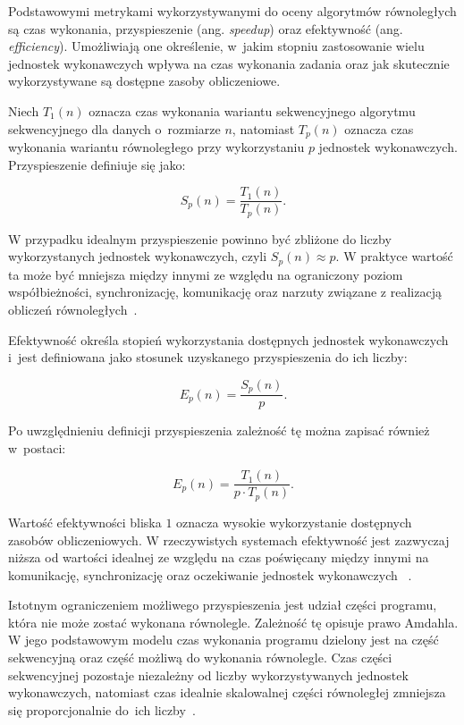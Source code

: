 Podstawowymi metrykami wykorzystywanymi do oceny algorytmów równoległych są czas wykonania,
przyspieszenie (ang. \textit{speedup}) oraz efektywność (ang. \textit{efficiency}).
Umożliwiają one określenie, w~jakim stopniu zastosowanie wielu jednostek wykonawczych wpływa na czas wykonania
zadania oraz jak skutecznie wykorzystywane są dostępne zasoby obliczeniowe.

Niech $T_1(n)$ oznacza czas wykonania wariantu sekwencyjnego algorytmu sekwencyjnego dla danych o~rozmiarze $n$, 
natomiast $T_p(n)$ oznacza czas wykonania wariantu równoległego przy wykorzystaniu $p$ jednostek wykonawczych. 
Przyspieszenie definiuje się jako:

\begin{equation}
    S_p(n) = \frac{T_1(n)}{T_p(n)}.
\end{equation}

W przypadku idealnym przyspieszenie powinno być zbliżone do liczby
wykorzystanych jednostek wykonawczych, czyli $S_p(n) \approx p$. W praktyce wartość ta może być mniejsza między innymi 
ze względu na ograniczony poziom współbieżności, synchronizację, komunikację oraz narzuty związane 
z realizacją obliczeń równoległych~\cite{bib:Jaja,bib:Grama}.

Efektywność określa stopień wykorzystania dostępnych jednostek wykonawczych i~jest definiowana
jako stosunek uzyskanego przyspieszenia do ich liczby:

\begin{equation}
    E_p(n) = \frac{S_p(n)}{p}.
\end{equation}

Po uwzględnieniu definicji przyspieszenia zależność tę można zapisać również w~postaci:

\begin{equation}
    E_p(n) = \frac{T_1(n)}{p \cdot T_p(n)}.
\end{equation}

Wartość efektywności bliska $1$ oznacza wysokie wykorzystanie dostępnych zasobów obliczeniowych.
W rzeczywistych systemach efektywność jest zazwyczaj niższa od wartości idealnej ze względu na czas
poświęcany między innymi na komunikację, synchronizację oraz oczekiwanie jednostek wykonawczych
~\cite{bib:Jaja,bib:Grama}.

Istotnym ograniczeniem możliwego przyspieszenia jest udział części programu, która nie może zostać
wykonana równolegle. Zależność tę opisuje prawo Amdahla. W jego podstawowym modelu czas wykonania
programu dzielony jest na część sekwencyjną oraz część możliwą do wykonania równolegle.
Czas części sekwencyjnej pozostaje niezależny od liczby wykorzystywanych jednostek wykonawczych,
natomiast czas idealnie skalowalnej części równoległej zmniejsza się proporcjonalnie do~ich liczby~\cite{bib:KarbowskiAmdahl}.

